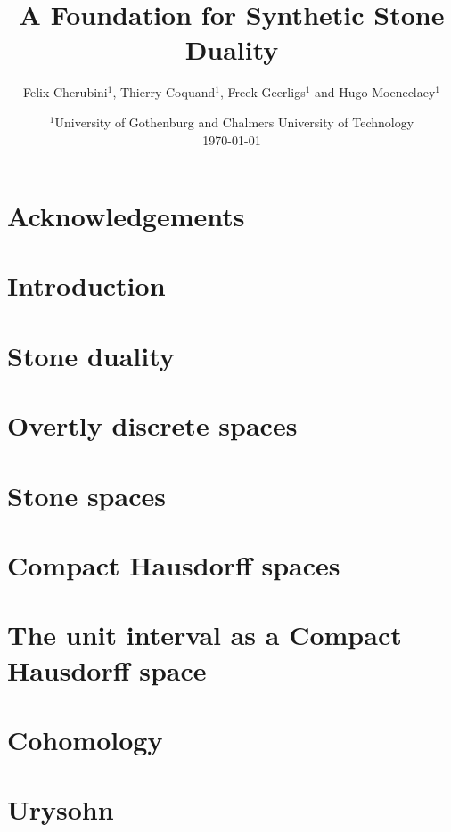 \documentclass{../util/zariski}
\title{A Foundation for Synthetic Stone Duality}
\begin{document}
\author{Felix Cherubini$^1$, Thierry Coquand$^1$, Freek Geerligs$^1$ and Hugo Moeneclaey$^1$}
\date{
  $^1$University of Gothenburg and Chalmers University of Technology \\[2ex]%
  \today
}

\maketitle
\begin{abstract}
  
\end{abstract}

\section*{Acknowledgements}


\section*{Introduction}


\section{Stone duality}







\section{Overtly discrete spaces}




\section{Stone spaces}




\section{Compact Hausdorff spaces}




\section{The unit interval as a Compact Hausdorff space}


 
\section{Cohomology}


\section{Urysohn}




\printbibliography
\end{document}
